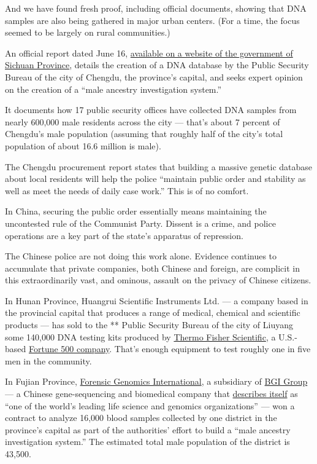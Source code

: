 And we have found fresh proof, including official documents, showing
that DNA samples are also being gathered in major urban centers. (For a
time, the focus seemed to be largely on rural communities.)

An official report dated June 16,
\href{http://www.ccgp-sichuan.gov.cn/cms/newscontent/contentupload/file/2020-07/c59d5ba5_0b21_4bc2_a0aa_3226885510ef.pdf}{available
on a website of the government of Sichuan Province}, details the
creation of a DNA database by the Public Security Bureau of the city of
Chengdu, the province's capital, and seeks expert opinion on the
creation of a ``male ancestry investigation system.''

It documents how 17 public security offices have collected DNA samples
from nearly 600,000 male residents across the city --- that's about 7
percent of Chengdu's male population (assuming that roughly half of the
city's total population of about 16.6 million is male).

The Chengdu procurement report states that building a massive genetic
database about local residents will help the police ``maintain public
order and stability as well as meet the needs of daily case work.'' This
is of no comfort.

In China, securing the public order essentially means maintaining the
uncontested rule of the Communist Party. Dissent is a crime, and police
operations are a key part of the state's apparatus of repression.

The Chinese police are not doing this work alone. Evidence continues to
accumulate that private companies, both Chinese and foreign, are
complicit in this extraordinarily vast, and ominous, assault on the
privacy of Chinese citizens.

In Hunan Province, Huangrui Scientific Instruments Ltd. --- a company
based in the provincial capital that produces a range of medical,
chemical and scientific products --- has sold to the ** Public Security
Bureau of the city of Liuyang some 140,000 DNA testing kits produced by
\href{https://www.thermofisher.com/hk/en/home.html}{Thermo Fisher
Scientific}, a U.S.-based
\href{https://fortune.com/fortune500/2019/thermo-fisher-scientific/}{Fortune
500 company}. That's enough equipment to test roughly one in five men in
the community.

In Fujian Province, \href{http://fgidna.com/lxwm/index_29.aspx}{Forensic
Genomics International}, a subsidiary of
\href{https://en.genomics.cn/}{BGI Group}--- a Chinese gene-sequencing
and biomedical company that
\href{https://en.genomics.cn/en-about.html}{describes itself} as ``one
of the world's leading life science and genomics organizations'' --- won
a contract to analyze 16,000 blood samples collected by one district in
the province's capital as part of the authorities' effort to build a
``male ancestry investigation system.'' The estimated total male
population of the district is 43,500.

